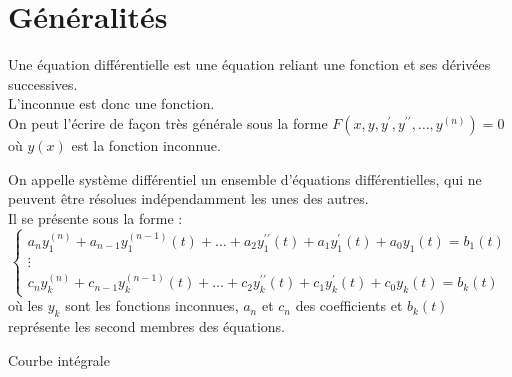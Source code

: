 \chapter{Généralités}

\begin{defi}
Une équation différentielle est une équation reliant une fonction et ses dérivées successives.\\
L'inconnue est donc une fonction.\\
On peut l'écrire de façon très générale sous la forme $F(x,y,y^{\prime},y^{\prime\prime},\hdots,y^{(n)})=0$ où $y(x)$ est la fonction inconnue.
\end{defi}
\begin{defi}
On appelle système différentiel un ensemble d'équations différentielles, qui ne peuvent être résolues indépendamment les unes des autres.\\
Il se présente sous la forme :
$$\begin{cases}
a_n y_1^{(n)}+a_{n-1}y_1^{(n-1)}(t)+\hdots+a_2 y_1^{\prime\prime}(t)+a_1 y_1^{\prime}(t)+a_0y_1(t) = b_1(t)\\
\vdots \\
c_n y_k^{(n)} + c_{n-1}y_k^{(n-1)}(t)+\hdots+c_2 y_k^{\prime\prime}(t)+c_1 y_k^{\prime}(t)+c_0y_k(t) = b_k(t)
\end{cases}$$
où les $y_k$ sont les fonctions inconnues, $a_n$ et $c_n$ des coefficients et $b_k(t)$ représente les second membres des équations.
\end{defi}

Courbe intégrale